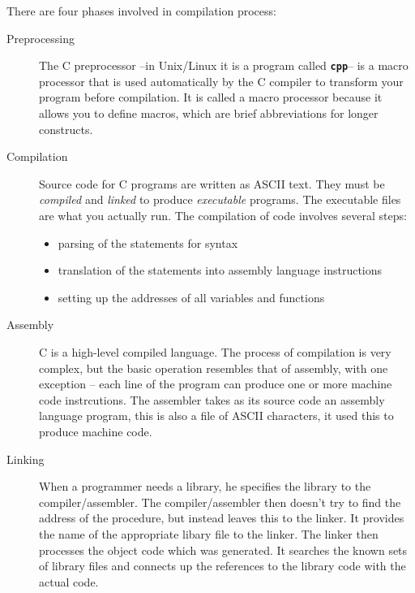 \documentclass[11pt,a4paper]{article}
\begin{document}
There are four phases involved in compilation process:
\begin{description} 
\item [Preprocessing] The C preprocessor --in Unix/Linux it is a program called \textbf{\texttt{cpp}}-- is a macro processor that is used automatically by the C compiler to transform your program before compilation. It is called a macro processor because it allows you to define macros, which are brief abbreviations for longer constructs.
\item [Compilation] Source code for C programs are written as ASCII text. They must be \emph{compiled} and \emph{linked} to produce \emph{executable} programs. The executable files are what you actually run. The compilation of code involves several steps:
  \begin{itemize}
  \item parsing of the statements for syntax
  \item translation of the statements into assembly language instructions
  \item setting up the addresses of all variables and functions
  \end{itemize}
\item [Assembly] C is a high-level compiled language. The process of compilation is very complex, but the basic operation resembles that of assembly, with one exception -- each line of the program can produce one or more machine code instrcutions. The assembler takes as its source code an assembly language program, this is also a file of ASCII characters, it used this to produce machine code.
\item [Linking] When a programmer needs a library, he specifies the library to the compiler/assembler. The compiler/assembler then doesn't try to find the address of the procedure, but instead leaves this to the linker. It provides the name of the appropriate libary file to the linker. The linker then processes the object code which was generated. It searches the known sets of library files and connects up the references to the library code with the actual code. 
\end{description} 
\end{document}
